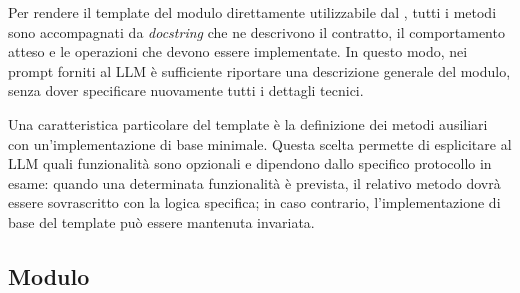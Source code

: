 Per rendere il template del modulo direttamente utilizzabile dal \codeagent{}, tutti i metodi sono accompagnati da \emph{docstring} che ne descrivono il contratto, il comportamento atteso e le operazioni che devono essere implementate. In questo modo, nei prompt forniti al LLM è sufficiente riportare una descrizione generale del modulo, senza dover specificare nuovamente tutti i dettagli tecnici.


Una caratteristica particolare del template è la definizione dei metodi ausiliari con un'implementazione di base minimale. Questa scelta permette di esplicitare al LLM quali funzionalità sono opzionali e dipendono dallo specifico protocollo in esame: quando una determinata funzionalità è prevista, il relativo metodo dovrà essere sovrascritto con la logica specifica; in caso contrario, l'implementazione di base del template può essere mantenuta invariata.



\subsection{Modulo \parser{}} %



